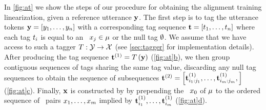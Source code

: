 In \autoref{fig:at} we show the steps of our procedure for obtaining
the alignment training linearization, given a reference utterance $\mathbf{y}$.
The first step is 
to tag the utterance tokens 
$\mathbf{y} = \left[y_1,\ldots,y_n\right]$ 
with a corresponding tag sequence 
$\mathbf{t}=\left[t_1,\ldots, t_n\right]$ where each 
tag $t_i$ is equal to an \attributevalue~$x_j \in \mu$ or 
the null tag $\emptyset$. We assume that we have access to such a tagger
$T : \mathcal{Y} \rightarrow \mathcal{X}$ (see \autoref{sec:tagger}
for implementation details). After producing the tag sequence $\mathbf{t}^{(1)} = T\left(\mathbf{y}\right)$ 
(\hyperref[fig:at]{\autoref{fig:at}b}),
we then group contiguous sequences of tags sharing the same tag value, discarding any null tag sequences to obtain the sequence of subsequences 
$\mathbf{t}^{(2)} = \left[\mathbf{t}^{(1)}_{i_1:j_1},\ldots,\mathbf{t}^{(1)}_{i_{m}:j_{m}}, \right]$ (\hyperref[fig:at]{\autoref{fig:at}c}).
Finally, $\mathbf{x}$ is constructed by 
by prepending the \dialogueact~$x_0$ of $\mu$ to the ordered sequence 
of \attributevalue~pairs $x_1,\ldots,x_{m}$ implied by $\mathbf{t}^{(1)}_{i_1},\ldots,\mathbf{t}^{(1)}_{i_{m}}$ (\hyperref[fig:at]{\autoref{fig:at}d}). 



%


